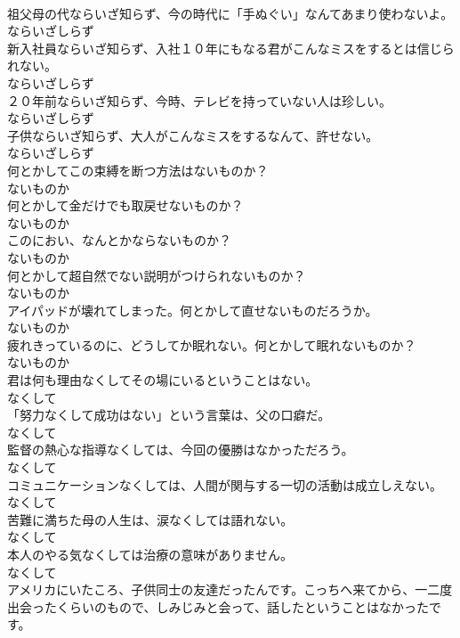 \documentclass[8pt]{extreport}
\begin{document}
\begin{CJK}{UTF8}{min}
\\	祖父母の代ならいざ知らず、今の時代に「手ぬぐい」なんてあまり使わないよ。	
\\	ならいざしらず
\\	新入社員ならいざ知らず、入社１０年にもなる君がこんなミスをするとは信じられない。	
\\	ならいざしらず
\\	２０年前ならいざ知らず、今時、テレビを持っていない人は珍しい。	
\\	ならいざしらず
\\	子供ならいざ知らず、大人がこんなミスをするなんて、許せない。	
\\	ならいざしらず
\\	何とかしてこの束縛を断つ方法はないものか？	
\\	ないものか
\\	何とかして金だけでも取戻せないものか？	
\\	ないものか
\\	このにおい、なんとかならないものか？	
\\	ないものか
\\	何とかして超自然でない説明がつけられないものか？	
\\	ないものか
\\	アイパッドが壊れてしまった。何とかして直せないものだろうか。	
\\	ないものか
\\	疲れきっているのに、どうしてか眠れない。何とかして眠れないものか？	
\\	ないものか
\\	君は何も理由なくしてその場にいるということはない。	
\\	なくして
\\	「努力なくして成功はない」という言葉は、父の口癖だ。	
\\	なくして
\\	監督の熱心な指導なくしては、今回の優勝はなかっただろう。	
\\	なくして
\\	コミュニケーションなくしては、人間が関与する一切の活動は成立しえない。	
\\	なくして
\\	苦難に満ちた母の人生は、涙なくしては語れない。	
\\	なくして
\\	本人のやる気なくしては治療の意味がありません。	
\\	なくして
\\	アメリカにいたころ、子供同士の友達だったんです。こっちへ来てから、一二度出会ったくらいのもので、しみじみと会って、話したということはなかったです。	

\end{CJK}
\end{document}
